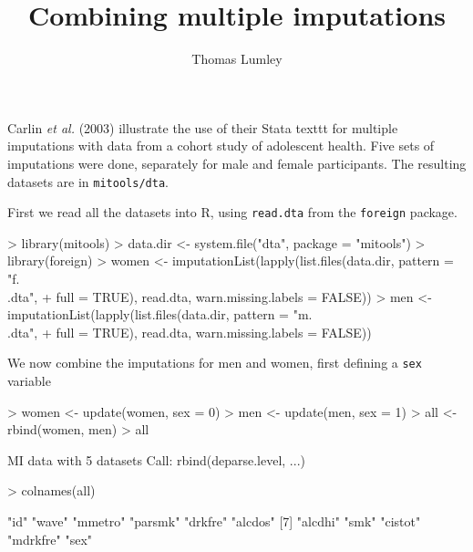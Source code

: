 \documentclass[12pt]{article}
\title{Combining multiple imputations}
\author{Thomas Lumley}
\begin{document}
\maketitle

Carlin \emph{et al.} (2003) illustrate the use of their Stata texttt for
multiple imputations with data from a cohort study of adolescent
health.  Five sets of imputations were done, separately for male and
female participants.  The resulting datasets are in \texttt{mitools/dta}.

First we read all the datasets into R, using \texttt{read.dta} from the \texttt{foreign} package.
\begin{Schunk}
\begin{Sinput}
> library(mitools)
> data.dir <- system.file("dta", package = "mitools")
> library(foreign)
> women <- imputationList(lapply(list.files(data.dir, pattern = "f.\\.dta", 
+     full = TRUE), read.dta, warn.missing.labels = FALSE))
> men <- imputationList(lapply(list.files(data.dir, pattern = "m.\\.dta", 
+     full = TRUE), read.dta, warn.missing.labels = FALSE))
\end{Sinput}
\end{Schunk}

We now combine the imputations for men and women, first defining a \texttt{sex} variable
\begin{Schunk}
\begin{Sinput}
> women <- update(women, sex = 0)
> men <- update(men, sex = 1)
> all <- rbind(women, men)
> all
\end{Sinput}
\begin{Soutput}
MI data with 5 datasets
Call: rbind(deparse.level, ...)
\end{Soutput}
\begin{Sinput}
> colnames(all)
\end{Sinput}
\begin{Soutput}
 [1] "id"      "wave"    "mmetro"  "parsmk"  "drkfre"  "alcdos" 
 [7] "alcdhi"  "smk"     "cistot"  "mdrkfre" "sex"    
\end{Soutput}
\end{Schunk}
\end{document}
